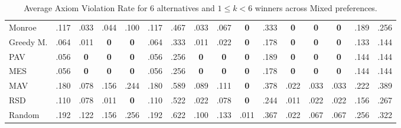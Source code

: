 \begin{table}[tbp]
\begin{tabular}{lccccccccccccccc}
Monroe & .117 & .033 & .044 & .100 & .117 & .467 & .033 & .067 & \cellcolor{green!25}\textbf{0} & .333 & \cellcolor{green!25}\textbf{0} & \textbf{0} & \textbf{0} & .189 & .256 \\
Greedy M. & .064 & .011 & \textbf{0} & \textbf{0} & .064 & .333 & .011 & .022 & \cellcolor{green!25}\textbf{0} & .178 & \cellcolor{green!25}\textbf{0} & \textbf{0} & \textbf{0} & .133 & .144 \\
PAV & .056 & \textbf{0} & \textbf{0} & \cellcolor{green!25}\textbf{0} & .056 & .256 & \textbf{0} & \textbf{0} & \textbf{0} & .189 & \cellcolor{green!25}\textbf{0} & \cellcolor{green!25}\textbf{0} & \textbf{0} & .144 & .144 \\
MES & .056 & \textbf{0} & \textbf{0} & \textbf{0} & .056 & .256 & \textbf{0} & \textbf{0} & \textbf{0} & .178 & \cellcolor{green!25}\textbf{0} & \cellcolor{green!25}\textbf{0} & \textbf{0} & .144 & .144 \\
MAV & .180 & .078 & .156 & .244 & .180 & .589 & .089 & .111 & \textbf{0} & .378 & .022 & .033 & .033 & .222 & .389 \\
RSD & .110 & .078 & .011 & \textbf{0} & .110 & .522 & .022 & .078 & \textbf{0} & .244 & .011 & .022 & .022 & .156 & .267 \\
Random & .192 & .122 & .156 & .256 & .192 & .622 & .100 & .133 & .011 & .367 & .022 & .067 & .067 & .256 & .322 \\
\bottomrule
\end{tabular}
\caption{Average Axiom Violation Rate for 6 alternatives and $1 \leq k < 6$ winners across Mixed preferences.}
\end{table}

